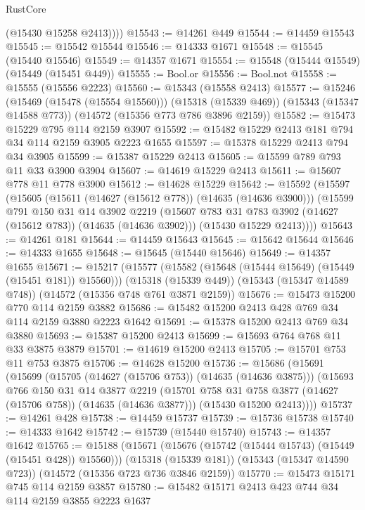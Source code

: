 \begin{lexlean}{RustCore}
\begin{coremodule}
          (@15430 @15258 @2413))))
@15543 := @14261 @449
@15544 := @14459 @15543
@15545 := @15542 @15544
@15546 := @14333 @1671
@15548 := @15545 (@15440 @15546)
@15549 := @14357 @1671
@15554 := @15548 (@15444 @15549) (@15449 (@15451 @449))
@15555 := Bool.or
@15556 := Bool.not
@15558 := @15555 (@15556 @2223)
@15560 := @15343 (@15558 @2413)
@15577 := @15246
    (@15469 (@15478 (@15554 @15560)))
    (@15318 (@15339 @469))
    (@15343 (@15347 @14588 @773))
    (@14572 (@15356 @773 @786 @3896 @2159))
@15582 := @15473 @15229 @795 @114 @2159 @3907
@15592 := @15482 @15229 @2413 @181 @794 @34 @114 @2159 @3905 @2223 @1655
@15597 := @15378 @15229 @2413 @794 @34 @3905
@15599 := @15387 @15229 @2413
@15605 := @15599 @789 @793 @11 @33 @3900 @3904
@15607 := @14619 @15229 @2413
@15611 := @15607 @778 @11 @778 @3900
@15612 := @14628 @15229
@15642 := @15592
    (@15597
      (@15605
        (@15611 (@14627 (@15612 @778)) (@14635 (@14636 @3900)))
        (@15599
          @791
          @150
          @31
          @14
          @3902
          @2219
          (@15607 @783 @31 @783 @3902 (@14627 (@15612 @783)) (@14635 (@14636 @3902)))
          (@15430 @15229 @2413))))
@15643 := @14261 @181
@15644 := @14459 @15643
@15645 := @15642 @15644
@15646 := @14333 @1655
@15648 := @15645 (@15440 @15646)
@15649 := @14357 @1655
@15671 := @15217
    (@15577 (@15582 (@15648 (@15444 @15649) (@15449 (@15451 @181)) @15560)))
    (@15318 (@15339 @449))
    (@15343 (@15347 @14589 @748))
    (@14572 (@15356 @748 @761 @3871 @2159))
@15676 := @15473 @15200 @770 @114 @2159 @3882
@15686 := @15482 @15200 @2413 @428 @769 @34 @114 @2159 @3880 @2223 @1642
@15691 := @15378 @15200 @2413 @769 @34 @3880
@15693 := @15387 @15200 @2413
@15699 := @15693 @764 @768 @11 @33 @3875 @3879
@15701 := @14619 @15200 @2413
@15705 := @15701 @753 @11 @753 @3875
@15706 := @14628 @15200
@15736 := @15686
    (@15691
      (@15699
        (@15705 (@14627 (@15706 @753)) (@14635 (@14636 @3875)))
        (@15693
          @766
          @150
          @31
          @14
          @3877
          @2219
          (@15701 @758 @31 @758 @3877 (@14627 (@15706 @758)) (@14635 (@14636 @3877)))
          (@15430 @15200 @2413))))
@15737 := @14261 @428
@15738 := @14459 @15737
@15739 := @15736 @15738
@15740 := @14333 @1642
@15742 := @15739 (@15440 @15740)
@15743 := @14357 @1642
@15765 := @15188
    (@15671 (@15676 (@15742 (@15444 @15743) (@15449 (@15451 @428)) @15560)))
    (@15318 (@15339 @181))
    (@15343 (@15347 @14590 @723))
    (@14572 (@15356 @723 @736 @3846 @2159))
@15770 := @15473 @15171 @745 @114 @2159 @3857
@15780 := @15482 @15171 @2413 @423 @744 @34 @114 @2159 @3855 @2223 @1637

\end{coremodule}
\end{lexlean}
